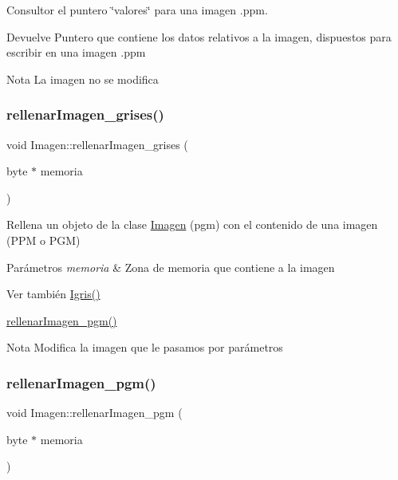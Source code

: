Consultor el puntero \char`\"{}valores\char`\"{} para una imagen .ppm. 

\begin{DoxyReturn}{Devuelve}
Puntero que contiene los datos relativos a la imagen, dispuestos para escribir en una imagen .ppm 
\end{DoxyReturn}
\begin{DoxyNote}{Nota}
La imagen no se modifica 
\end{DoxyNote}
\mbox{\label{classImagen_a9a3870103cebf6da0f9771628c182ccf}} 
\subsubsection{\texorpdfstring{rellenar\+Imagen\+\_\+grises()}{rellenarImagen\_grises()}}
{\footnotesize\ttfamily void Imagen\+::rellenar\+Imagen\+\_\+grises (\begin{DoxyParamCaption}\item[{byte $\ast$}]{memoria }\end{DoxyParamCaption})}



Rellena un objeto de la clase \hyperlink{classImagen}{Imagen} (pgm) con el contenido de una imagen (P\+PM o P\+GM) 


\begin{DoxyParams}{Parámetros}
{\em memoria} & Zona de memoria que contiene a la imagen \\
\hline
\end{DoxyParams}
\begin{DoxySeeAlso}{Ver también}
\hyperlink{classImagen_a77d5744cb232e2de19e3941eae893961}{Igris()} 

\hyperlink{classImagen_a361eeffdebd18fa24810cb8e058287ca}{rellenar\+Imagen\+\_\+pgm()} 
\end{DoxySeeAlso}
\begin{DoxyNote}{Nota}
Modifica la imagen que le pasamos por parámetros 
\end{DoxyNote}
\mbox{\label{classImagen_a361eeffdebd18fa24810cb8e058287ca}} 
\subsubsection{\texorpdfstring{rellenar\+Imagen\+\_\+pgm()}{rellenarImagen\_pgm()}}
{\footnotesize\ttfamily void Imagen\+::rellenar\+Imagen\+\_\+pgm (\begin{DoxyParamCaption}\item[{byte $\ast$}]{memoria }\end{DoxyParamCaption})}



